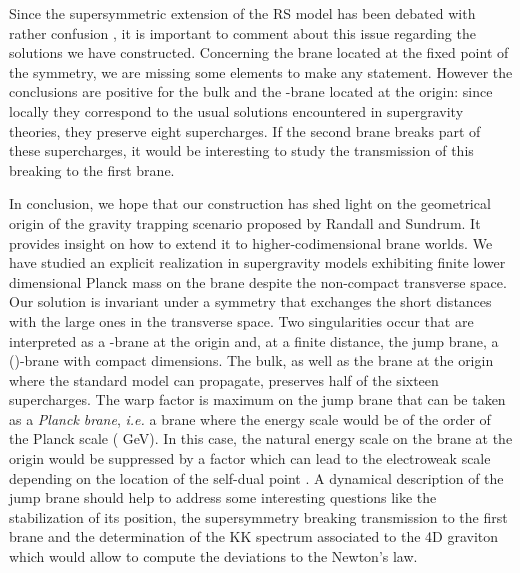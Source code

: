 \documentclass[a4paper,12pt]{article}
\def\dperp{d_{\scriptscriptstyle\perp}}
\begin{document}
Since the supersymmetric extension of the RS model has been debated with
rather confusion \cite{CGS3,RSsusy}, it is important to comment about this issue regarding
the solutions we have constructed. Concerning the brane located at the fixed point
of the \coordHE{} symmetry, we are missing some elements to make any statement. However
the conclusions are positive for the bulk and the \coordHE{}-brane
located at the origin: since locally they correspond to the usual solutions
encountered in supergravity theories, they preserve eight supercharges. If the
second brane breaks part of these supercharges, it would be interesting
to study the transmission of this breaking to the first brane.

In conclusion, we hope that our construction has shed light on the geometrical
origin of the gravity trapping scenario proposed by Randall and Sundrum. It provides
insight on how to extend it to higher-codimensional brane worlds. We have studied
an explicit realization in supergravity models exhibiting finite lower dimensional
Planck mass on the brane despite the non-compact transverse space. Our solution
is invariant under a \coordHE{} symmetry that exchanges the short distances with the
large ones in the transverse space. Two singularities occur that are interpreted as
a \coordHE{}-brane at the origin and, at a finite distance, the jump brane,
a (\coordHE{})-brane with \myHighlight{$\dperp-1$}\coordHE{} compact dimensions. The bulk, as well as the
brane at the origin where the
standard model can propagate, preserves half of the sixteen supercharges.
The warp factor is maximum on the jump brane that can be taken as a
{\it Planck brane}, {\it i.e.} a brane where the energy scale would be of the order
of the Planck scale (\coordHE{} GeV). In this case, the natural energy scale
on the brane at the origin would be suppressed by a factor \coordHE{} which
can lead to the electroweak scale depending on the location of the \coordHE{} self-dual
point \coordHE{}.
A dynamical description of the jump brane should help to address some interesting
questions like the stabilization of its position, the supersymmetry breaking
transmission to the first brane and the determination of the KK spectrum associated
to the 4D graviton which would allow to compute the deviations to the Newton's law.

\end{document}
